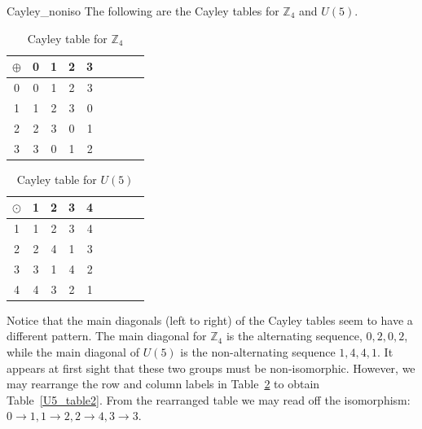 \begin{example}{Cayley_noniso}
The following are the Cayley tables for ${\mathbb Z}_4$ and $U(5)$.

\begin{table}[H]
\caption{Cayley table for ${\mathbb Z}_4$}
\label{Z4_add_table}
{\small
\begin{center}
\begin{tabular}{c|cccccccc}
$\oplus$ & 0 & 1 & 2 & 3  \\
\hline
0        & 0 & 1 & 2 & 3  \\
1       & 1 & 2 & 3 & 0  \\
2       & 2 & 3 & 0 & 1 \\
3       & 3 & 0 & 1 & 2 \\

\end{tabular}
\end{center}
}
\end{table}

\begin{table}[H]
\caption{Cayley table for $U(5)$\label{U5_table}}
{\small
\begin{center}
\begin{tabular}{c|cccccccc}
$\odot$ & 1 & 2 & 3 & 4  \\
\hline
1        & 1 & 2 & 3 & 4  \\
2       & 2 & 4 & 1 & 3  \\
3       & 3 & 1 & 4 & 2 \\
4       & 4 & 3 & 2 & 1 \\

\end{tabular}
\end{center}
}
\end{table}

Notice that the main diagonals (left to right) of the Cayley tables seem to have a different pattern.  The main diagonal for ${\mathbb Z}_4$ is the alternating sequence, $0, 2, 0, 2$, while the main diagonal of $U(5)$ is the  non-alternating sequence $1, 4, 4, 1$.  It appears at first sight that these two groups must be non-isomorphic.  However, we may rearrange the row and column labels  in Table~\ref{U5_table} to obtain Table~\ref{U5_table2}. From the rearranged table we may read off the isomorphism: $0 \rightarrow 1, 1\rightarrow 2, 2\rightarrow 4, 3 \rightarrow 3$.

\begin{table}[H]
\caption{Rearranged Cayley table for $U(5)$\label{U5_table2}}


\end{table}
\end{example}
